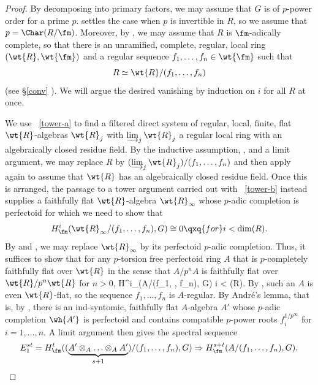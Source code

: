\begin{proof}
By decomposing into primary factors, we may assume that $G$ is of $p$-power order for a prime $p$.  settles the case when $p$ is invertible in $R$, so we assume that $p = \Char(R/\fm)$. Moreover, by , we may assume that $R$ is $\fm$-adically complete, so that there is an unramified, complete, regular, local ring $(\wt{R}, \wt{\fm})$ and a regular sequence $f_1, \dotsc, f_n \in \wt{\fm}$ such that
\[
R \simeq \wt{R}/(f_1, \dotsc, f_n)
\]
(see \S\ref{conv}%
). We will argue the desired vanishing by induction on $i$ for all $R$ at once.

We use ~\ref{tower-a} to find a filtered direct system of regular, local, finite, flat $\wt{R}$-algebras $\wt{R}_j$ with $\varinjlim_j \wt{R}_j$ a regular local ring with an algebraically closed residue field. By the inductive assumption, , %
and a limit argument, we may replace $R$ by $(\varinjlim_j \wt{R}_j)/(f_1, \dotsc, f_n)$ and then apply  again to assume that $\wt{R}$ has an algebraically closed residue field. Once this is arranged, the passage to a tower argument carried out with ~\ref{tower-b} instead supplies a faithfully flat %
$\wt{R}$-algebra $\wt{R}_\infty$ whose $p$-adic completion is perfectoid %
for which we need to show that
\[
H^i_\fm(\wt{R}_\infty/(f_1, \dotsc, f_n), G) \cong 0 \qxq{for} i < \dim(R).
\]
By %
and , we may replace $\wt{R}_\infty$ by its perfectoid
$p$-adic completion. Thus, it suffices to show that for any $p$-torsion free perfectoid ring $A$ that is $p$-completely faithfully flat over $\wt{R}$ in the sense that $A/p^nA$ is faithfully flat over $\wt{R}/p^n\wt{R}$ for $n > 0$,
\be \label{ultimate-desire}
H^i_\fm(A/(f_1, \dotsc, f_n), G)   i < \dim(R).
\ee
By , such an $A$ is even $\wt{R}$-flat, so the sequence $f_1,\ldots,f_n$ is $A$-regular. By Andr\'{e}'s lemma, that is, by , there is an ind-syntomic, faithfully flat $A$-algebra $A'$ whose $p$-adic completion $\wh{A'}$ is perfectoid and contains compatible $p$-power roots $f_i^{1/p^\infty}$ for $i = 1, \dotsc, n$. A limit argument then gives the spectral sequence
\[
E_1^{st} = H^t_\fm((\underbrace{A'\otimes_A \ldots\otimes_A A'}_{s + 1})/(f_1, \dotsc, f_n),G) \Rightarrow H^{s + t}_\fm(A/(f_1, \dotsc, f_n), G).
\]
\end{proof}
